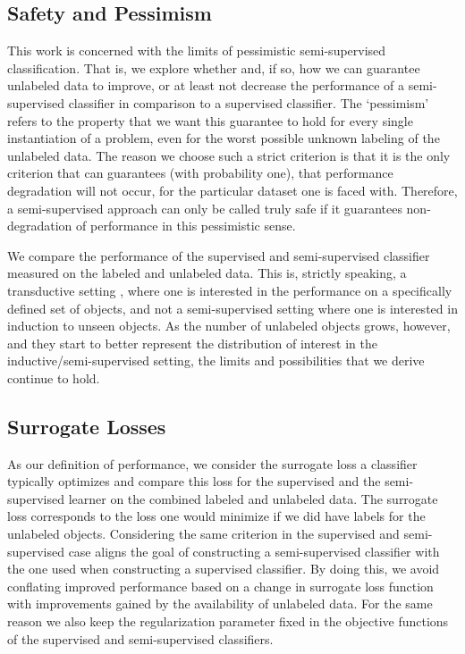 \documentclass[twoside]{memoir}\usepackage[]{graphicx}\usepackage{xcolor}
\renewcommand{\cite}{\citep}
\begin{document}
\subsection{Safety and Pessimism}
This work is concerned with the limits of pessimistic semi-supervised classification. That is, we explore whether and, if so, how we can guarantee unlabeled data to improve, or at least not decrease the performance of a semi-supervised classifier in comparison to a supervised classifier. The `pessimism' refers to the property that we want this guarantee to hold for every single instantiation of a problem, even for the worst possible unknown labeling of the unlabeled data. The reason we choose such a strict criterion is that it is the only criterion that can guarantees (with probability one), that performance degradation will not occur, for the particular dataset one is faced with. Therefore, a semi-supervised approach can only be called truly safe if it guarantees non-degradation of performance in this pessimistic sense.

We compare the performance of the supervised and semi-supervised classifier measured on the labeled and unlabeled data. This is, strictly speaking, a transductive setting \cite{Joachims1999}, where one is interested in the performance on a specifically defined set of objects, and not a semi-supervised setting where one is interested in induction to unseen objects. As the number of unlabeled objects grows, however, and they start to better represent the distribution of interest in the inductive/semi-supervised setting, the limits and possibilities that we derive continue to hold.

\subsection{Surrogate Losses}
As our definition of performance, we consider the surrogate loss a classifier typically optimizes and compare this loss for the supervised and the semi-supervised learner on the combined labeled and unlabeled data. The surrogate loss corresponds to the loss one would minimize if we did have labels for the unlabeled objects. Considering the same criterion in the supervised and semi-supervised case aligns the goal of constructing a semi-supervised classifier with the one used when constructing a supervised classifier. By doing this, we avoid conflating improved performance based on a change in surrogate loss function with improvements gained by the availability of unlabeled data. For the same reason we also keep the regularization parameter fixed in the objective functions of the supervised and semi-supervised classifiers. 
\end{document}
